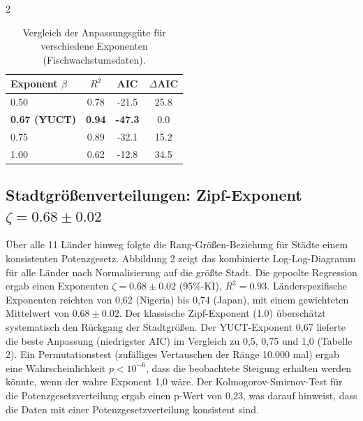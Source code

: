 \documentclass[11pt,a4paper]{article}
\begin{document}
\begin{multicols}{2}
		\begin{table}[htbp]
			\centering
			\caption{Vergleich der Anpassungsgüte für verschiedene Exponenten (Fischwachstumsdaten).}
			\label{tab:comparison_fish}
			\begin{tabular}{lccc}
				\toprule
				\textbf{Exponent \(\beta\)} & \(R^2\) & AIC & \(\Delta\)AIC \\
				\midrule
				0.50 & 0.78 & -21.5 & 25.8 \\
				\textbf{0.67 (YUCT)} & \textbf{0.94} & \textbf{-47.3} & 0.0 \\
				0.75 & 0.89 & -32.1 & 15.2 \\
				1.00 & 0.62 & -12.8 & 34.5 \\
				\bottomrule
			\end{tabular}
		\end{table}
		
		\subsection{Stadtgrößenverteilungen: Zipf-Exponent \(\zeta = 0.68 \pm 0.02\)}
		
		Über alle 11 Länder hinweg folgte die Rang-Größen-Beziehung für Städte einem konsistenten Potenzgesetz. Abbildung 2 zeigt das kombinierte Log-Log-Diagramm für alle Länder nach Normalisierung auf die größte Stadt. Die gepoolte Regression ergab einen Exponenten \(\zeta = 0.68 \pm 0.02\) (95\%-KI), \(R^2 = 0.93\). Länderspezifische Exponenten reichten von 0,62 (Nigeria) bis 0,74 (Japan), mit einem gewichteten Mittelwert von \(0.68 \pm 0.02\). Der klassische Zipf-Exponent (1.0) überschätzt systematisch den Rückgang der Stadtgrößen. Der YUCT-Exponent 0,67 lieferte die beste Anpassung (niedrigster AIC) im Vergleich zu 0,5, 0,75 und 1,0 (Tabelle 2). Ein Permutationstest (zufälliges Vertauschen der Ränge 10.000 mal) ergab eine Wahrscheinlichkeit \(p < 10^{-6}\), dass die beobachtete Steigung erhalten werden könnte, wenn der wahre Exponent 1,0 wäre. Der Kolmogorov-Smirnov-Test für die Potenzgesetzverteilung ergab einen p-Wert von 0,23, was darauf hinweist, dass die Daten mit einer Potenzgesetzverteilung konsistent sind.
		

\end{multicols}
\end{document}
